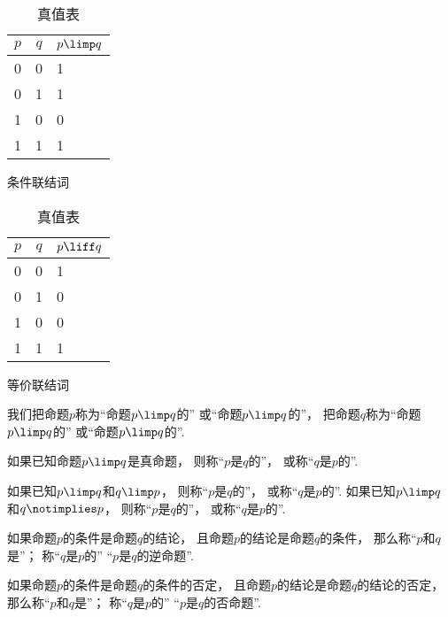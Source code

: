 \begin{table}[htb]
	\begin{subtable}[ht]{0.45\textwidth}
		\centering
		\begin{tabular}{|*{2}{c|}p{2cm}|}
			\hline
			\(p\) & \(q\) & \(p \limp q\) \\ \hline
			0 & 0 & 1 \\ \hline
			0 & 1 & 1 \\ \hline
			1 & 0 & 0 \\ \hline
			1 & 1 & 1 \\ \hline
		\end{tabular}
		\caption{条件联结词}
	\end{subtable}
	\begin{subtable}[ht]{0.45\textwidth}
		\centering
		\begin{tabular}{|*{2}{c|}p{2cm}|}
			\hline
			\(p\) & \(q\) & \(p \liff q\) \\ \hline
			0 & 0 & 1 \\ \hline
			0 & 1 & 0 \\ \hline
			1 & 0 & 0 \\ \hline
			1 & 1 & 1 \\ \hline
		\end{tabular}
	\caption{等价联结词}
	\end{subtable}
	\caption{真值表}
\end{table}

我们把命题\(p\)称为“命题\(p \limp q\)的”
或“命题\(p \limp q\)的”，
把命题\(q\)称为“命题\(p \limp q\)的”
或“命题\(p \limp q\)的”.

如果已知命题\(p \limp q\)是真命题，
则称“\(p\)是\(q\)的”，
或称“\(q\)是\(p\)的”.

如果已知\(p \limp q\)和\(q \limp p\)，
则称“\(p\)是\(q\)的”，
或称“\(q\)是\(p\)的”.
如果已知\(p \limp q\)和\(q \notimplies p\)，
则称“\(p\)是\(q\)的”，
或称“\(q\)是\(p\)的”.

如果命题\(p\)的条件是命题\(q\)的结论，
且命题\(p\)的结论是命题\(q\)的条件，
那么称“\(p\)和\(q\)是”；
称“\(q\)是\(p\)的”
“\(p\)是\(q\)的逆命题”.

如果命题\(p\)的条件是命题\(q\)的条件的否定，
且命题\(p\)的结论是命题\(q\)的结论的否定，
那么称“\(p\)和\(q\)是”；
称“\(q\)是\(p\)的”
“\(p\)是\(q\)的否命题”.

